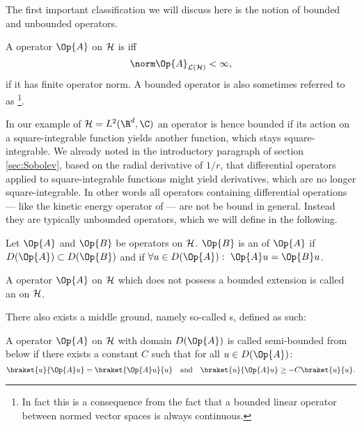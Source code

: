 The first important classification we will discuss here
is the notion of bounded and unbounded operators.
\begin{defn}
	\label{defn:OpBounded}
	A operator $\Op{A}$ on $\mathcal{H}$ is  iff
	\[ \opnorm{\Op{A}} < \infty, \]
	\ie if it has finite operator norm.
	A bounded operator is also sometimes referred to as %
	\footnote{In fact this is a consequence from the fact that a bounded linear operator
	between normed vector spaces is always continuous.}.
\end{defn}
In our example of $\hilbert = L^2(\R^d, \C)$ an operator is hence bounded
if its action on a square-integrable function yields another function,
which stays square-integrable.
We already noted in the introductory paragraph of section \vref{sec:Sobolev},
based on the radial derivative of $1/r$,
that differential operators applied to square-integrable functions
might yield derivatives, which are no longer square-integrable.
In other words all operators containing differential operations
--- like the kinetic energy operator of \QM ---
are not be bound in general.
Instead they are typically unbounded operators,
which we will define in the following.

\begin{defn}
	Let $\Op{A}$ and $\Op{B}$ be operators on $\mathcal{H}$.
	$\Op{B}$ is an  of $\Op{A}$ if
	\mbox{$D(\Op{A}) \subset D(\Op{B})$}
	and if $\forall u \in D(\Op{A}): \ \Op{A}u = \Op{B}u$.
\end{defn}

\begin{defn}
	A operator $\Op{A}$ on $\mathcal{H}$ which does not possess
	a bounded extension is called an  on $\mathcal{H}$.
\end{defn}

There also exists a middle ground,
namely so-called s, defined as such:
\begin{defn}
	A operator $\Op{A}$ on $\mathcal{H}$ with domain $D(\Op{A})$
	is called semi-bounded from below if there exists a constant $C$
	such that for all $u \in D(\Op{A})$:
	\[ \braket{u}{\Op{A} u} = \braket{\Op{A} u}{u} \quad \text{and}
	\quad \braket{u}{\Op{A} u} \geq -C \braket{u}{u}. \]
\end{defn}


